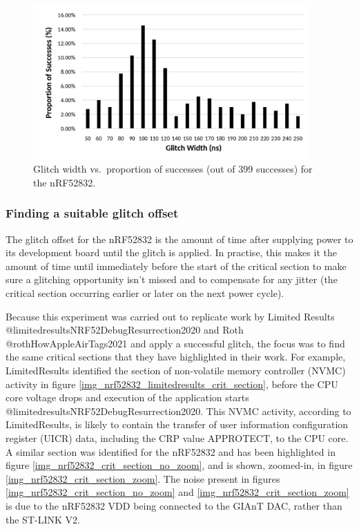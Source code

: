\begin{figure}
\centering
\includegraphics[width=4.16667in,height=\textheight]{res/nrf52832_width_vs_success.png}
\caption{Glitch width vs.~proportion of successes (out of 399 successes)
for the nRF52832.\label{img_nrf52832_width_vs_success}}
\end{figure}

\hypertarget{finding-a-suitable-glitch-offset}{%
\subsubsection{\texorpdfstring{Finding a suitable glitch
offset\label{section_nrf52832_suitable_offset}}{Finding a suitable glitch offset}}\label{finding-a-suitable-glitch-offset}}

The glitch offset for the nRF52832 is the amount of time after supplying
power to its development board until the glitch is applied. In practise,
this makes it the amount of time until immediately before the start of
the critical section to make sure a glitching opportunity isn't missed
and to compensate for any jitter (the critical section occurring earlier
or later on the next power cycle).

Because this experiment was carried out to replicate work by Limited
Results @limitedresultsNRF52DebugResurrection2020 and Roth
@rothHowAppleAirTags2021 and apply a successful glitch, the focus was to
find the same critical sections that they have highlighted in their
work. For example, LimitedResults identified the section of non-volatile
memory controller (NVMC) activity in figure
\ref{img_nrf52832_limitedresults_crit_section}, before the CPU core
voltage drops and execution of the application starts
@limitedresultsNRF52DebugResurrection2020. This NVMC activity, according
to LimitedResults, is likely to contain the transfer of user information
configuration register (UICR) data, including the CRP value APPROTECT,
to the CPU core. A similar section was identified for the nRF52832 and
has been highlighted in figure \ref{img_nrf52832_crit_section_no_zoom},
and is shown, zoomed-in, in figure \ref{img_nrf52832_crit_section_zoom}.
The noise present in figures \ref{img_nrf52832_crit_section_no_zoom} and
\ref{img_nrf52832_crit_section_zoom} is due to the nRF52832 VDD being
connected to the GIAnT DAC, rather than the ST-LINK V2.

